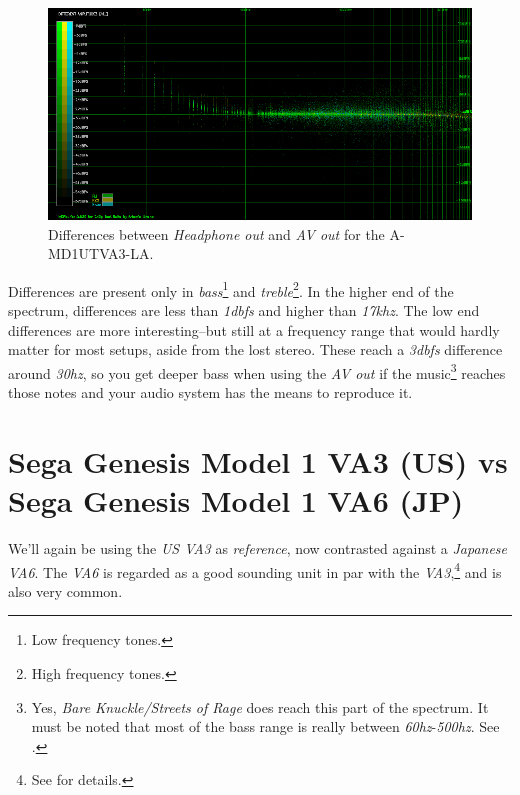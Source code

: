 \documentclass[10pt,a4paper]{report}
\newcommand{\hz}[1]{\textit{\mbox{#1\acrshort{hz}}}}
\newcommand{\khz}[1]{\textit{\mbox{#1\acrshort{khz}}}}
\newcommand{\db}[1]{\textit{\mbox{#1\acrshort{dbfs}}}}
\begin{document}
\begin{figure}[H]
	\centering
	\includegraphics[width=1.0\linewidth]{images/results/1-A-MD1UTVA3-LA_vs_A-MD1UTVA3-AV-LA.png}
	\caption[A-MD1UTVA3-LA AV Out]{Differences between \textit{Headphone out} and \textit{AV out} for the A-MD1UTVA3-LA.}
	\label{fig:A-MD1UTVA3-LA_vs_A-MD1UTVA3-AV-LA}
\end{figure}

Differences are present only in \textit{bass}\footnote{Low frequency tones.} and \textit{treble}\footnote{High frequency tones.}. In the higher end of the spectrum, differences are less than \db{1} and higher than \khz{17}. The low end differences are more interesting--but still at a frequency range that would hardly matter for most setups, aside from the lost stereo. These reach a \db{3} difference around \hz{30}, so you get deeper bass when using the \textit{AV out} if the music\footnote{Yes, \textit{Bare Knuckle/Streets of Rage} does reach this part of the spectrum. It must be noted that most of the bass range is really between \hz{60}-\hz{500}. See \cite{bass}.} reaches those notes and your audio system has the means to reproduce it.

\section{Sega Genesis Model 1 VA3 (US) vs\\ Sega Genesis Model 1 VA6 (JP)}

We'll again be using the \textit{US VA3} as \textit{reference}, now contrasted against a \textit{Japanese VA6}. The \textit{VA6} is regarded as a good sounding unit in par with the \textit{VA3},\footnote{See \cite{genesisaudio} for details.} and is also very common. 
\end{document}
